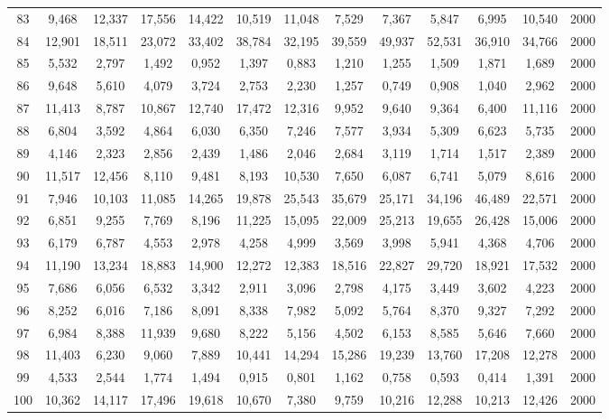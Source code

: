 {\begin{longtable}{ >{\footnotesize}ccccccccccccc}
83  & 9,468  & 12,337 & 17,556 & 14,422 & 10,519 & 11,048 & 7,529  & 7,367  & 5,847  & 6,995  & 10,540 & 2000 \\
84  & 12,901 & 18,511 & 23,072 & 33,402 & 38,784 & 32,195 & 39,559 & 49,937 & 52,531 & 36,910 & 34,766 & 2000 \\
85  & 5,532  & 2,797  & 1,492  & 0,952  & 1,397  & 0,883  & 1,210  & 1,255  & 1,509  & 1,871  & 1,689  & 2000 \\
86  & 9,648  & 5,610  & 4,079  & 3,724  & 2,753  & 2,230  & 1,257  & 0,749  & 0,908  & 1,040  & 2,962  & 2000 \\
87  & 11,413 & 8,787  & 10,867 & 12,740 & 17,472 & 12,316 & 9,952  & 9,640  & 9,364  & 6,400  & 11,116 & 2000 \\
88  & 6,804  & 3,592  & 4,864  & 6,030  & 6,350  & 7,246  & 7,577  & 3,934  & 5,309  & 6,623  & 5,735  & 2000 \\
89  & 4,146  & 2,323  & 2,856  & 2,439  & 1,486  & 2,046  & 2,684  & 3,119  & 1,714  & 1,517  & 2,389  & 2000 \\
90  & 11,517 & 12,456 & 8,110  & 9,481  & 8,193  & 10,530 & 7,650  & 6,087  & 6,741  & 5,079  & 8,616  & 2000 \\
91  & 7,946  & 10,103 & 11,085 & 14,265 & 19,878 & 25,543 & 35,679 & 25,171 & 34,196 & 46,489 & 22,571 & 2000 \\
92  & 6,851  & 9,255  & 7,769  & 8,196  & 11,225 & 15,095 & 22,009 & 25,213 & 19,655 & 26,428 & 15,006 & 2000 \\
93  & 6,179  & 6,787  & 4,553  & 2,978  & 4,258  & 4,999  & 3,569  & 3,998  & 5,941  & 4,368  & 4,706  & 2000 \\
94  & 11,190 & 13,234 & 18,883 & 14,900 & 12,272 & 12,383 & 18,516 & 22,827 & 29,720 & 18,921 & 17,532 & 2000 \\
95  & 7,686  & 6,056  & 6,532  & 3,342  & 2,911  & 3,096  & 2,798  & 4,175  & 3,449  & 3,602  & 4,223  & 2000 \\
96  & 8,252  & 6,016  & 7,186  & 8,091  & 8,338  & 7,982  & 5,092  & 5,764  & 8,370  & 9,327  & 7,292  & 2000 \\
97  & 6,984  & 8,388  & 11,939 & 9,680  & 8,222  & 5,156  & 4,502  & 6,153  & 8,585  & 5,646  & 7,660  & 2000 \\
98  & 11,403 & 6,230  & 9,060  & 7,889  & 10,441 & 14,294 & 15,286 & 19,239 & 13,760 & 17,208 & 12,278 & 2000 \\
99  & 4,533  & 2,544  & 1,774  & 1,494  & 0,915  & 0,801  & 1,162  & 0,758  & 0,593  & 0,414  & 1,391  & 2000 \\
100 & 10,362 & 14,117 & 17,496 & 19,618 & 10,670 & 7,380  & 9,759  & 10,216 & 12,288 & 10,213 & 12,426 & 2000  \\ \hline
\end{longtable}
}
